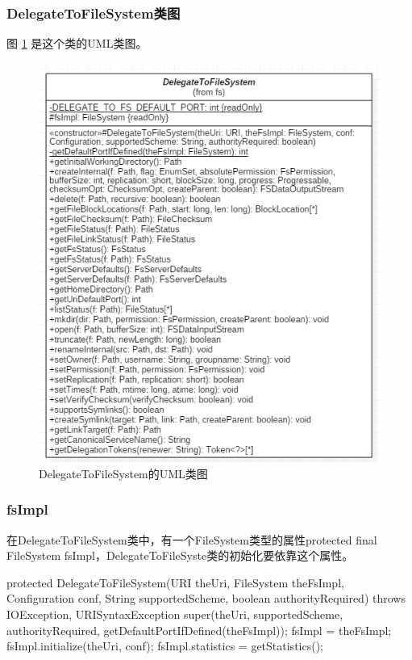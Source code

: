 \subsubsection{DelegateToFileSystem类图}
图 \ref{fig:DelegateToFileSystem} 是这个类的UML类图。
\begin{figure}
\centering
\includegraphics[width=1\linewidth]{UML/abstractfilesystem/DelegateToFileSystem.PNG}
\caption{DelegateToFileSystem的UML类图}
\label{fig:DelegateToFileSystem}
\end{figure}

\subsubsection{fsImpl}
在DelegateToFileSystem类中，有一个FileSystem类型的属性protected final FileSystem fsImpl，DelegateToFileSyste类的初始化要依靠这个属性。
\begin{java}
protected DelegateToFileSystem(URI theUri, FileSystem theFsImpl,
      Configuration conf, String supportedScheme, boolean authorityRequired)
      throws IOException, URISyntaxException {
    super(theUri, supportedScheme, authorityRequired,
        getDefaultPortIfDefined(theFsImpl));
    fsImpl = theFsImpl;
    fsImpl.initialize(theUri, conf);
    fsImpl.statistics = getStatistics();
  }
\end{java}

